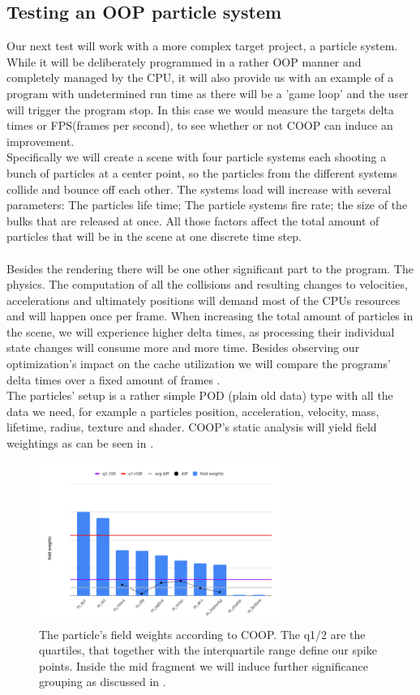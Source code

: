 \subsection{Testing an OOP particle system}\label{testing_oop}
Our next test will work with a more complex target project, a particle system. While it will be deliberately programmed in a rather OOP manner and completely managed by the CPU, it will also provide us with an example of a program with undetermined run time as there will be a 'game loop' and the user will trigger the program stop. In this case we would measure the targets delta times or FPS(frames per second), to see whether or not COOP can induce an improvement.\\
Specifically we will create a scene with four particle systems each shooting a bunch of particles at a center point, so the particles from the different systems collide and bounce off each other. The systems load will increase with several parameters: The particles life time; The particle systems fire rate; the size of the bulks that are released at once. All those factors affect the total amount of particles that will be in the scene at one discrete time step.\\\\
Besides the rendering there will be one other significant part to the program. The physics. The computation of all the collisions and resulting changes to velocities, accelerations and ultimately positions will demand most of the CPUs resources and will happen once per frame. When increasing the total amount of particles in the scene, we will experience higher delta times, as processing their individual state changes will consume more and more time. Besides observing our optimization's impact on the cache utilization we will compare the programs' delta times over a fixed amount of frames .\\
The particles' setup is a rather simple POD (plain old data) type with all the data we need, for example a particles position, acceleration, velocity, mass, lifetime, radius, texture and shader. COOP's static analysis will yield field weightings as can be seen in .
\begin{figure}[!htbp]
	\centering
	\includegraphics[width=0.7\textwidth,height=0.5\textwidth]{PICs/particle_field_weights}
	\caption{The particle's field weights according to COOP. The q1/2 are the quartiles, that together with the interquartile range define our spike points. Inside the mid fragment we will induce further significance grouping as discussed in .}
	\label{particle_field_weights}
\end{figure}

